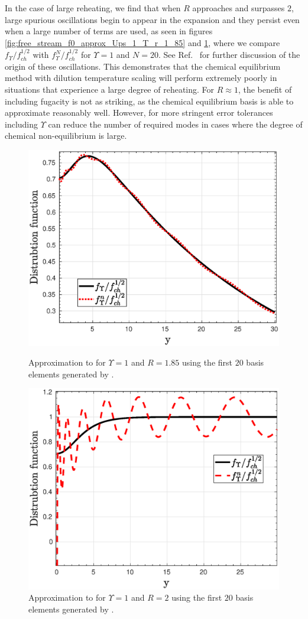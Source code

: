  In the case of large reheating, we find that when $R$ approaches and surpasses $2$, large spurious oscillations begin to appear in the expansion and they persist even when a large number of terms are used, as seen in figures  \ref{fig:free_stream_f0_approx_Ups_1_T_r_1_85} and \ref{fig:free_stream_f0_approx_Ups_1_T_r_2}, where we compare $f_\Upsilon/f_{ch}^{1/2}$ with $f_{\Upsilon}^N/f_{ch}^{1/2}$ for $\Upsilon=1$ and $N=20$. See Ref.~\cite{Birrell_orthopoly} for further discussion of the origin of these oscillations. This demonstrates that the chemical equilibrium method with dilution temperature scaling will  perform extremely poorly in situations that experience a large degree of reheating. For $R\approx 1$, the benefit of including fugacity is not as striking, as the chemical equilibrium basis is able to approximate  reasonably well.  However, for more stringent error tolerances including $\Upsilon$ can reduce the number of required modes in cases where the degree of chemical non-equilibrium is large.
\begin{figure}[ht]
\begin{minipage}[b]{0.5\linewidth}
\centerline{\includegraphics[height=6.cm]{06-appendix/SpectralMethodBoltzmann/Figures/free_stream_f0_approx_Ups_1_T_r_1_85_n_20.eps}}
\caption{Approximation to  for $\Upsilon=1$ and $R=1.85$ using the first $20$ basis elements generated by .}\label{fig:free_stream_f0_approx_Ups_1_T_r_1_85}
 \end{minipage}
 \hspace{0.5cm}
 \begin{minipage}[b]{0.5\linewidth}
\centerline{\includegraphics[height=6.cm]{06-appendix/SpectralMethodBoltzmann/Figures/free_stream_f0_approx_Ups_1_T_r_2_n_20.eps}}
\caption{Approximation to  for $\Upsilon=1$ and $R=2$ using the first $20$ basis elements generated by .}\label{fig:free_stream_f0_approx_Ups_1_T_r_2}
\end{minipage}
\end{figure}
